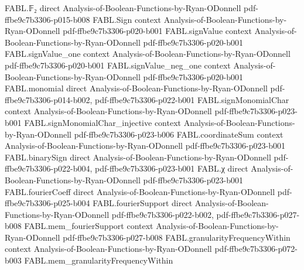 \begin{theorem}
\label{FABL.widthThreeTseitin_sound}
\leanok
{}
\proofstep
  {FABL.𝔽₂}
  {direct}
  {Analysis-of-Boolean-Functions-by-Ryan-ODonnell}
  {pdf-ffbe9c7b3306-p015-b008}
\proofstep
  {FABL.Sign}
  {context}
  {Analysis-of-Boolean-Functions-by-Ryan-ODonnell}
  {pdf-ffbe9c7b3306-p020-b001}
\proofstep
  {FABL.signValue}
  {context}
  {Analysis-of-Boolean-Functions-by-Ryan-ODonnell}
  {pdf-ffbe9c7b3306-p020-b001}
\proofstep
  {FABL.signValue_one}
  {context}
  {Analysis-of-Boolean-Functions-by-Ryan-ODonnell}
  {pdf-ffbe9c7b3306-p020-b001}
\proofstep
  {FABL.signValue_neg_one}
  {context}
  {Analysis-of-Boolean-Functions-by-Ryan-ODonnell}
  {pdf-ffbe9c7b3306-p020-b001}
\proofstep
  {FABL.monomial}
  {direct}
  {Analysis-of-Boolean-Functions-by-Ryan-ODonnell}
  {pdf-ffbe9c7b3306-p014-b002,
    pdf-ffbe9c7b3306-p022-b001}
\proofstep
  {FABL.signMonomialChar}
  {context}
  {Analysis-of-Boolean-Functions-by-Ryan-ODonnell}
  {pdf-ffbe9c7b3306-p023-b001}
\proofstep
  {FABL.signMonomialChar_injective}
  {context}
  {Analysis-of-Boolean-Functions-by-Ryan-ODonnell}
  {pdf-ffbe9c7b3306-p023-b006}
\proofstep
  {FABL.coordinateSum}
  {context}
  {Analysis-of-Boolean-Functions-by-Ryan-ODonnell}
  {pdf-ffbe9c7b3306-p023-b001}
\proofstep
  {FABL.binarySign}
  {direct}
  {Analysis-of-Boolean-Functions-by-Ryan-ODonnell}
  {pdf-ffbe9c7b3306-p022-b004,
    pdf-ffbe9c7b3306-p023-b001}
\proofstep
  {FABL.χ}
  {direct}
  {Analysis-of-Boolean-Functions-by-Ryan-ODonnell}
  {pdf-ffbe9c7b3306-p023-b001}
\proofstep
  {FABL.fourierCoeff}
  {direct}
  {Analysis-of-Boolean-Functions-by-Ryan-ODonnell}
  {pdf-ffbe9c7b3306-p025-b004}
\proofstep
  {FABL.fourierSupport}
  {direct}
  {Analysis-of-Boolean-Functions-by-Ryan-ODonnell}
  {pdf-ffbe9c7b3306-p022-b002,
    pdf-ffbe9c7b3306-p027-b008}
\proofstep
  {FABL.mem_fourierSupport}
  {context}
  {Analysis-of-Boolean-Functions-by-Ryan-ODonnell}
  {pdf-ffbe9c7b3306-p027-b008}
\proofstep
  {FABL.granularityFrequencyWithin}
  {context}
  {Analysis-of-Boolean-Functions-by-Ryan-ODonnell}
  {pdf-ffbe9c7b3306-p072-b003}
\proofstep
  {FABL.mem_granularityFrequencyWithin}

\end{theorem}
